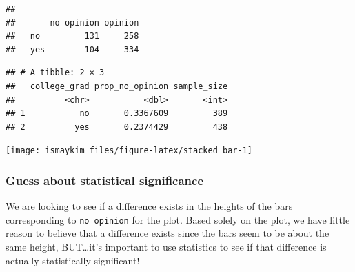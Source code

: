 \documentclass[]{tufte-book}
\newenvironment{Shaded}{\begin{snugshade}}{\end{snugshade}}
\newcommand{\KeywordTok}[1]{\textcolor[rgb]{0.13,0.29,0.53}{\textbf{{#1}}}}
\newcommand{\DataTypeTok}[1]{\textcolor[rgb]{0.13,0.29,0.53}{{#1}}}
\newcommand{\StringTok}[1]{\textcolor[rgb]{0.31,0.60,0.02}{{#1}}}
\newcommand{\NormalTok}[1]{{#1}}
\begin{document}
\begin{verbatim}
##      
##       no opinion opinion
##   no         131     258
##   yes        104     334
\end{verbatim}

\begin{Shaded}
\end{Shaded}

\begin{verbatim}
## # A tibble: 2 × 3
##   college_grad prop_no_opinion sample_size
##          <chr>           <dbl>       <int>
## 1           no       0.3367609         389
## 2          yes       0.2374429         438
\end{verbatim}

\begin{Shaded}
\end{Shaded}

\begin{center}\texttt{[image: ismaykim\_files/figure-latex/stacked\_bar-1]} \end{center}

\subsubsection{Guess about statistical
significance}\label{guess-about-statistical-significance-2}

We are looking to see if a difference exists in the heights of the bars
corresponding to \texttt{no\ opinion} for the plot. Based solely on the
plot, we have little reason to believe that a difference exists since
the bars seem to be about the same height, BUT\ldots{}it's important to
use statistics to see if that difference is actually statistically
significant!
\end{document}
